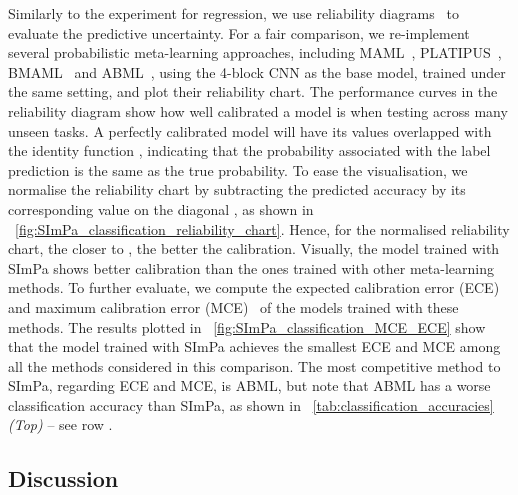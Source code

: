         Similarly to the experiment for regression, we use reliability diagrams~\cite{guo2017oncalibration} to evaluate the predictive uncertainty. For a fair comparison, we re-implement several probabilistic meta-learning approaches, including MAML~\cite{finn2017model}, PLATIPUS~\cite{finn2018probabilistic}, BMAML~\cite{yoon2018bayesian} and ABML~\cite{ravi2018amortized}, using the 4-block CNN as the base model, trained under the same setting, and plot their reliability chart. The performance curves in the reliability diagram show how well calibrated a model is when testing across many unseen tasks. A perfectly calibrated model will have its values overlapped with the identity function , indicating that the probability associated with the label prediction is the same as the true probability. To ease the visualisation, we normalise the reliability chart by subtracting the predicted accuracy by its corresponding value on the diagonal , as shown in \figureautorefname~\ref{fig:SImPa_classification_reliability_chart}. Hence, for the normalised reliability chart, the closer to , the better the calibration. Visually, the model trained with SImPa shows better calibration than the ones trained with other meta-learning methods. To further evaluate, we compute the expected calibration error (ECE) and maximum calibration error (MCE)~\cite{guo2017oncalibration} of the models trained with these methods. The results plotted in \figureautorefname~\ref{fig:SImPa_classification_MCE_ECE} show that the model trained with SImPa achieves the smallest ECE and MCE among all the methods considered in this comparison.  The most competitive method to SImPa, regarding ECE and MCE, is ABML, but note that ABML has a worse classification accuracy than SImPa, as shown in \tableautorefname~\ref{tab:classification_accuracies} \emph{(Top)} -- see row .

    \subsection{Discussion}

